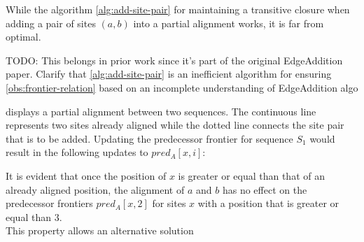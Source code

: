 While the algorithm \ref{alg:add-site-pair} for maintaining a transitive closure when adding a pair of sites $(a, b)$ into a partial alignment works, it is far from optimal. 



TODO: This belongs in prior work since it's part of the original EdgeAddition paper. Clarify that \ref{alg:add-site-pair} is an inefficient algorithm for ensuring \ref{obs:frontier-relation} based on an incomplete understanding of EdgeAddition algo

 displays a partial alignment between two sequences. The continuous line represents two sites already aligned while the dotted line connects the site pair that is to be added. Updating the predecessor frontier for sequence $S_1$ would result in the following updates to $pred_A[x, i]$:

It is evident that once the position of $x$ is greater or equal than that of an already aligned position, the alignment of $a$ and $b$ has no effect on the predecessor frontiers $pred_A[x, 2]$ for sites $x$ with a position that is greater or equal than $3$.\\
This property allows an alternative solution 


